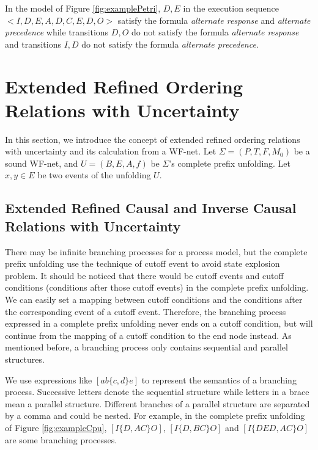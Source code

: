 \documentclass{llncs}
\begin{document}
\begin{example}\label{ex:relationFormulas}
In the model of Figure \ref{fig:examplePetri}, $D,E$ in the execution sequence $<I,D,E,A,D,C,E,D,O>$ satisfy the formula \textit{alternate response} and \textit{alternate precedence} while transitions $D,O$ do not satisfy the formula \textit{alternate response} and transitions $I,D$ do not satisfy the formula \textit{alternate precedence}.
\end{example}

\section{Extended Refined Ordering Relations with Uncertainty}\label{sec:relations}
In this section, we introduce the concept of extended refined ordering relations with uncertainty and its calculation from a WF-net. Let $\Sigma=(P,T,F,M_{0})$ be a sound WF-net, and $U=(B,E,A,f)$ be $\Sigma$'s complete prefix unfolding. Let $x,y\in E$ be two events of the unfolding $U$.

\subsection{Extended Refined Causal and Inverse Causal Relations with Uncertainty}\label{subsec:causalAndInverseCausal}
There may be infinite branching processes for a process model, but the complete prefix unfolding use the technique of cutoff event to avoid state explosion problem. It should be noticed that there would be cutoff events and cutoff conditions (conditions after those cutoff events) in the complete prefix unfolding. We can easily set a mapping between cutoff conditions and the conditions after the corresponding event of a cutoff event. Therefore, the branching process expressed in a complete prefix unfolding never ends on a cutoff condition, but will continue from the mapping of a cutoff condition to the end node instead. As mentioned before, a branching process only contains sequential and parallel structures.

We use expressions like $[ab\{c,d\}e]$ to represent the semantics of a branching process. Successive letters denote the sequential structure while letters in a brace mean a parallel structure. Different branches of a parallel structure are separated by a comma and could be nested. For example, in the complete prefix unfolding of Figure \ref{fig:exampleCpu}, $[I\{D,AC\}O]$, $[I\{D,BC\}O]$ and $[I\{DED,AC\}O]$ are some branching processes.
\end{document}
